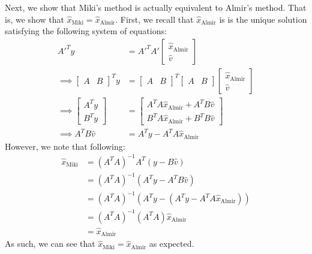\documentclass[12pt]{exam}
\begin{document}
\begin{questions}
\begin{solution}
\begin{enumerate}[label=(\alph*)]
      Next, we show that Miki's method is actually equivalent to Almir's method. That is, we show that $\hat{x}_{\text{Miki}} = \hat{x}_{\text{Almir}}$. First, we recall that $\hat{x}_{\text{Almir}}$ is is the unique solution satisfying the following system of equations:
      \begin{align*}
        A'^Ty &= A'^TA' \begin{bmatrix} \hat{x}_{\text{Almir}} \\ \hat{v} \end{bmatrix} \\
        \implies \begin{bmatrix} A & B \end{bmatrix}^Ty &= \begin{bmatrix} A & B \end{bmatrix}^T\begin{bmatrix} A & B \end{bmatrix} \begin{bmatrix} \hat{x}_{\text{Almir}} \\ \hat{v} \end{bmatrix} \tag{Definition of $A'$} \\
        \implies 
        \begin{bmatrix} 
          A^Ty \\
          B^Ty
        \end{bmatrix} &= 
        \begin{bmatrix}
        A^TA\hat{x}_{\text{Almir}} + A^TB\hat{v} \\
        B^TA\hat{x}_{\text{Almir}} + B^TB\hat{v}
        \end{bmatrix} \tag{Matrix Multiplication} \\
        \implies A^TB\hat{v} &= A^Ty - A^TA\hat{x}_{\text{Almir}} \tag{Taking just the top system}
      \end{align*}
      However, we note that following:
      \begin{align*}
        \hat{x}_{\text{Miki}} &= (A^TA)^{-1}A^T(y - B\hat{v}) \\
        &= (A^TA)^{-1}(A^Ty - A^TB\hat{v}) \tag{Distributing $A^T$} \\
        &= (A^TA)^{-1}(A^Ty - (A^Ty - A^TA\hat{x}_{\text{Almir}})) \tag{Subtituting results from above} \\
        &= (A^TA)^{-1 }(A^TA)\hat{x}_{\text{Almir}} \tag{Simplifying} \\ 
        &= \hat{x}_{\text{Almir}}
      \end{align*}
      As such, we can see that $\hat{x}_{\text{Miki}} = \hat{x}_{\text{Almir}}$ as expected.


\end{enumerate}
\end{solution}
\end{questions}
\end{document}
